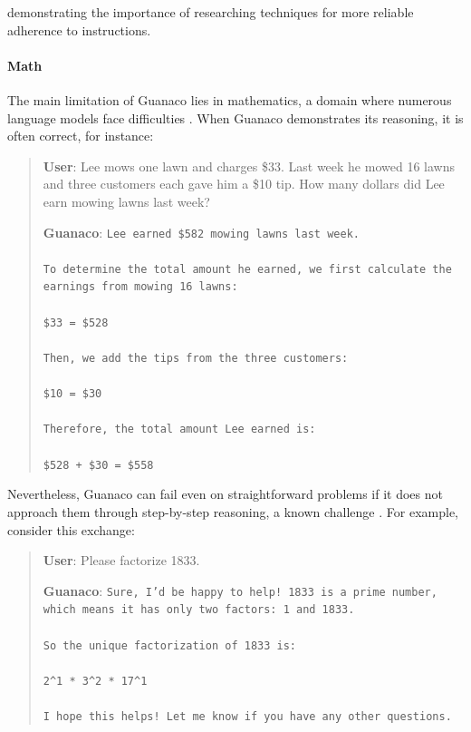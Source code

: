 demonstrating the importance of researching techniques for more reliable adherence to instructions.

\paragraph{Math} The main limitation of {Guanaco} lies in mathematics, a domain where numerous language models face difficulties \citep{liang2022holistic}. When {Guanaco} demonstrates its reasoning, it is often correct, for instance:

\begin{quote}
    \textbf{User}: Lee mows one lawn and charges \$33. Last week he mowed 16 lawns and three customers each gave him a \$10 tip. How many dollars did Lee earn mowing lawns last week?

    \textbf{Guanaco}: \texttt{Lee earned \$582 mowing lawns last week. \\ \\ To determine the total amount he earned, we first calculate the earnings from mowing 16 lawns: \\ \\  \$33  = \$528 \\ \\ Then, we add the tips from the three customers: \\  \\ \$10  = \$30 \\ \\ Therefore, the total amount Lee earned is: \\ \\ \$528 + \$30 = \$558}
\end{quote}

Nevertheless, {Guanaco} can fail even on straightforward problems if it does not approach them through step-by-step reasoning, a known challenge \cite{weichain}. For example, consider this exchange:

\begin{quote}
    \textbf{User}: Please factorize 1833.

    \textbf{Guanaco}: \texttt{Sure, I'd be happy to help! 1833 is a prime number, which means it has only two factors: 1 and 1833. \\ \\ So the unique factorization of 1833 is: \\ \\ 2\^{}1 * 3\^{}2 * 17\^{}1 \\ \\ I hope this helps! Let me know if you have any other questions.}
\end{quote}

